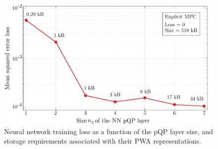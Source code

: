 \begin{figure}[h]
	\vspace{5pt}
	\begin{center}
		\includegraphics[scale=0.55]{../images/chap4_sim_res_loss_weight.pdf}    %
		\caption{Neural network training loss as a function of the	pQP layer size, and storage requirements associated with their PWA representations.} 
		\label{fig:pQP_mse_size}
	\end{center}
\end{figure}

